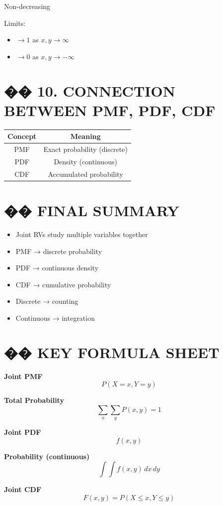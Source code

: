 \documentclass[12pt]{article}
\begin{document}
Non-decreasing

Limits:
\begin{itemize}
\item $\to 1$ as $x,y \to \infty$
\item $\to 0$ as $x,y \to -\infty$
\end{itemize}

\section*{�� 10. CONNECTION BETWEEN PMF, PDF, CDF}

\begin{center}
\begin{tabular}{c|c}
Concept & Meaning \\
\hline
PMF & Exact probability (discrete) \\
PDF & Density (continuous) \\
CDF & Accumulated probability \\
\end{tabular}
\end{center}

\section*{�� FINAL SUMMARY}

\begin{itemize}
\item Joint RVs study multiple variables together
\item PMF → discrete probability
\item PDF → continuous density
\item CDF → cumulative probability
\item Discrete → counting
\item Continuous → integration
\end{itemize}

\section*{�� KEY FORMULA SHEET}

\textbf{Joint PMF}
\[
P(X=x, Y=y)
\]

\textbf{Total Probability}
\[
\sum_x \sum_y P(x,y) = 1
\]

\textbf{Joint PDF}
\[
f(x,y)
\]

\textbf{Probability (continuous)}
\[
\int \int f(x,y)\,dx\,dy
\]

\textbf{Joint CDF}
\[
F(x,y) = P(X \leq x, Y \leq y)
\]
\end{document}
